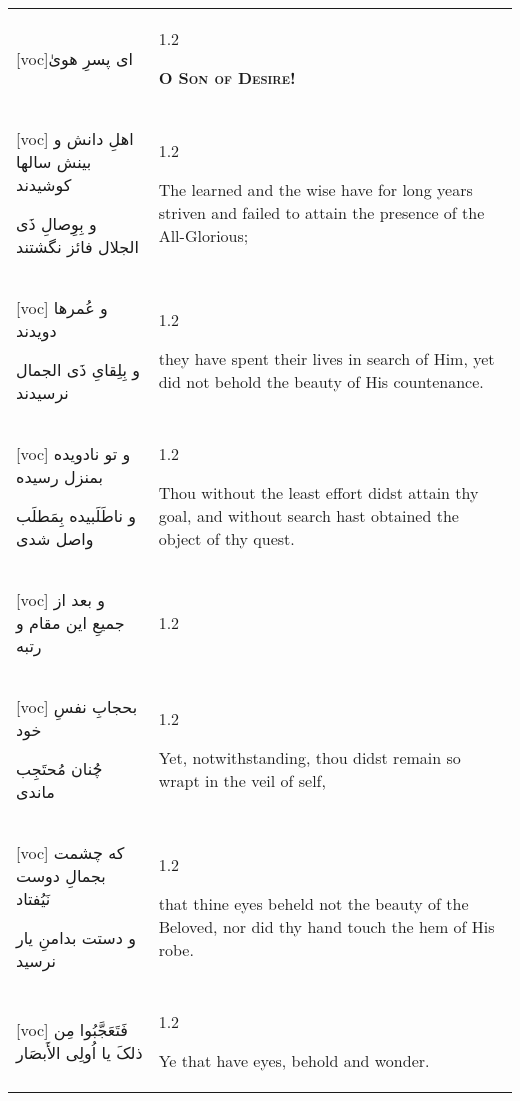 \documentclass[11pt]{article}
\makeatletter
\newenvironment{orig}
  {\begin{farsi}[voc]}
  {\end{farsi}}
\newenvironment{trans}
  {\Large\begin{spacing}{1.2}\raggedright}
  {\end{spacing}}
\newenvironment{word}
  {\begin{tabular}[t]{p{2.75in}@{\hspace{3em}}p{2.75in}}}
  {\end{tabular}}
\newcommand{\ayat}[2]{\begin{orig}#1\end{orig} & \begin{trans}#2\end{trans}}
\newcommand{\heading}[2]{\textsc{\textbf{#1}} %
}
\makeatother
\begin{document}
\begin{word}
\ayat{ای پسرِ هویٰ}{\heading{O Son of Desire!}{}} \\ \ayat{
اهلِ دانش و بينش سالها کوشيدند

و بِوِصالِ ذَی الجلال فائز نگشتند
}{The learned and the wise have for long years striven and failed to attain
  the presence of the All-Glorious;} \vspace{-1ex}\\ \ayat{
و عُمرها دويدند

و بِلِقایِ ذَی الجمال نرسيدند
}{they have spent their lives in search of Him, yet did not behold the beauty
  of His countenance.} \vspace{-1ex}\\ \ayat{
و تو نادويده بمنزل رسيده

و ناطَلَبيده بِمَطلَب واصل شدی
}{Thou without the least effort didst attain thy goal, and without search hast
  obtained the object of thy quest.} \vspace{-1ex}\\ \ayat{
و بعد از جميعِ اين مقام و رتبه
}{} \vspace{-1ex}\\ \ayat{
بحجابِ نفسِ خود

چُنان مُحتَجِب ماندی
}{Yet, notwithstanding, thou didst remain so wrapt in the veil of
  self,} \\ \ayat{
که چشمت بجمالِ دوست نَيُفتاد

و دستت بدامنِ يار نرسيد
}{that thine eyes beheld not the beauty of the Beloved, nor did thy hand touch
  the hem of His robe.} \vspace{-1ex}\\ \ayat{
فَتَعَجَّبُوا مِن ذلکَ يا اُولِی الأَبصَار
}{Ye that have eyes, behold and wonder.}
\end{word}

\pagebreak
\end{document}
